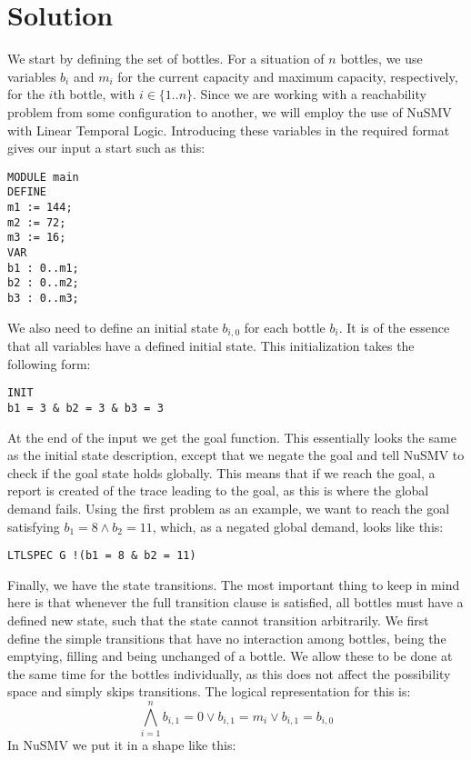 \section{Solution}
We start by defining the set of bottles. For a situation of $n$ bottles, we use variables $b_i$ and $m_i$ for the current capacity and maximum capacity, respectively, for the $i$th bottle, with $i \in \{1..n \}$. Since we are working with a reachability problem from some configuration to another, we will employ the use of NuSMV with Linear Temporal Logic. Introducing these variables in the required format gives our input a start such as this:\\
\begin{verbatim}
MODULE main
DEFINE
m1 := 144;
m2 := 72;
m3 := 16;
VAR
b1 : 0..m1;
b2 : 0..m2;
b3 : 0..m3;
\end{verbatim}
We also need to define an initial state $b_{i,0}$ for each bottle $b_i$. It is of the essence that all variables have a defined initial state. This initialization takes the following form:
\begin{verbatim}
INIT
b1 = 3 & b2 = 3 & b3 = 3
\end{verbatim}
At the end of the input we get the goal function. This essentially looks the same as the initial state description, except that we negate the goal and tell NuSMV to check if the goal state holds globally. This means that if we reach the goal, a report is created of the trace leading to the goal, as this is where the global demand fails. Using the first problem as an example, we want to reach the goal satisfying $b_1 = 8 \land b_2 = 11$, which, as a negated global demand, looks like this:\\
\begin{verbatim}
LTLSPEC G !(b1 = 8 & b2 = 11)
\end{verbatim}
Finally, we have the state transitions. The most important thing to keep in mind here is that whenever the full transition clause is satisfied, all bottles must have a defined new state, such that the state cannot transition arbitrarily. We first define the simple transitions that have no interaction among bottles, being the emptying, filling and being unchanged of a bottle. We allow these to be done at the same time for the bottles individually, as this does not affect the possibility space and simply skips transitions. The logical representation for this is:\\
\[ \bigwedge_{i=1}^n b_{i,1} = 0 \lor b_{i,1} = m_i \lor b_{i,1} = b_{i,0} \]
In NuSMV we put it in a shape like this:\\
